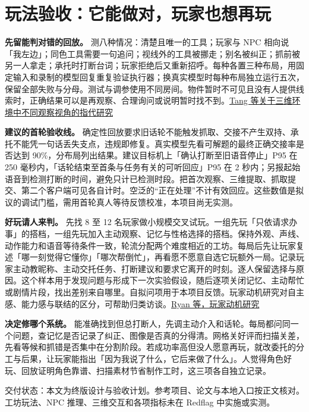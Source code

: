 \documentclass[UTF8,11pt,fontset=fandol,a4paper]{ctexart}
\newcommand{\src}[2]{\href{#1}{#2}}
\newcommand{\page}[1]{\clearpage\section{#1}}
\newcommand{\captext}[1]{\par{\small\color{muted}\noindent #1\par}}
\begin{document}
\page{玩法验收：它能做对，玩家也想再玩}
\textbf{先留能判对错的回放。} 测八种情况：清楚且唯一的工具；玩家与 NPC 相向说「我左边」；同色工具需要一句追问；视线外的工具被挪走；别名被纠正；抓前被另一人拿走；承托时打断台词；玩家拒绝后又重新招呼。每种各置三种布局，用固定输入和录制的模型回复重复验证执行器；换真实模型时每种布局独立运行五次，保留全部失败与分母。测试与调参使用不同房间。物件暂时不可见且没有人提供线索时，正确结果可以是再观察、合理询问或说明暂时找不到。\src{https://aclanthology.org/2024.emnlp-main.1100/}{Tang 等关于三维环境中不同观察视角的指代研究}

\textbf{建议的首轮验收线。} 确定性回放要求旧话轮不能触发抓取、交接不产生双持、承托不能凭一句话丢失支点，违规即修复。真实模型先看可解题的最终正确交接率是否达到 90\%，分布局列出结果。建议目标机上「确认打断至旧语音停止」P95 在 250 毫秒内，「话轮结束至首条与任务有关的可听回应」P95 在 2 秒内；另报起始语音到检测打断的时间，避免只计已检测时段。把首次观察、三维提取、抓取提交、第二个客户端可见各自计时。空泛的“正在处理”不计有效回应。这些数值是拟议的调试门槛，需用首轮真人等待反馈校准，本项目尚无实测。

\textbf{好玩请人来判。} 先找 8 至 12 名玩家做小规模交叉试玩。一组先玩「只依请求办事」的搭档，一组先玩加入主动观察、记忆与性格选择的搭档。保持外观、声线、动作能力和语音等待条件一致，轮流分配两个难度相近的工坊。每局后先让玩家复述「哪一刻觉得它懂你」「哪次帮倒忙」，再看愿不愿意自选它玩额外一局。记录玩家主动教昵称、主动交托任务、打断建议和要求它离开的时刻。逐人保留选择与原因。这个样本用于发现问题与形成下一次实验假设，随后逐项关闭记忆、主动帮忙或剧情片段，找出差别来自哪里。自拟问项用于本项目反馈。玩家动机研究对自主感、能力感与联结的区分，可帮助归类访谈。\src{https://selfdeterminationtheory.org/wp-content/uploads/2020/10/2006_RyanRigbyPrzybylski_MandE.pdf}{Ryan 等，玩家动机研究}

\textbf{决定修哪个系统。} 能准确找到但总打断人，先调主动介入和话轮。每局都问同一个问题，查记忆是否记录了纠正、图像是否真的分得清。网格关好评而扫描关差，先看等候和抓错是否集中在分割阶段。若成功率高但没人愿意再玩，就改委托的分工与后果，让玩家能指出「因为我说了什么，它后来做了什么」。人觉得角色好玩、回放证明角色靠谱、扫描素材节省制作工时，这三项各自独立记录。

\captext{交付状态：本文为终版设计与验收计划。参考项目、论文与本地入口按正文核对。工坊玩法、NPC 推理、三维交互和各项指标未在 Redflag 中实施或实测。}
\end{document}
